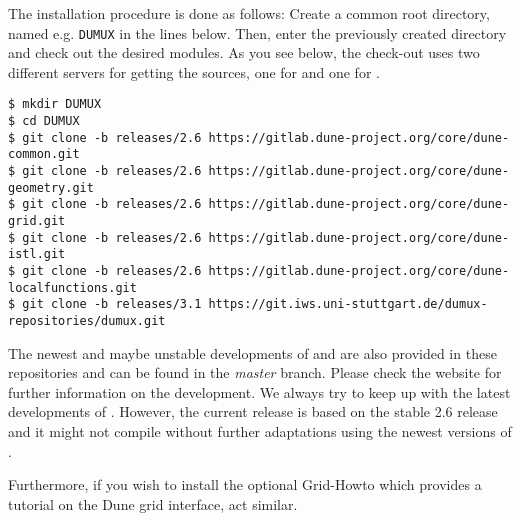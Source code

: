 The installation procedure is done as follows:
Create a common root directory, named e.g. \texttt{DUMUX} in the lines below.
Then, enter the previously created directory and check out the desired modules.
As you see below, the check-out uses two different servers for getting the sources,
one for \Dune and one for \Dumux.

\begin{lstlisting}[style=Bash]
$ mkdir DUMUX
$ cd DUMUX
$ git clone -b releases/2.6 https://gitlab.dune-project.org/core/dune-common.git
$ git clone -b releases/2.6 https://gitlab.dune-project.org/core/dune-geometry.git
$ git clone -b releases/2.6 https://gitlab.dune-project.org/core/dune-grid.git
$ git clone -b releases/2.6 https://gitlab.dune-project.org/core/dune-istl.git
$ git clone -b releases/2.6 https://gitlab.dune-project.org/core/dune-localfunctions.git
$ git clone -b releases/3.1 https://git.iws.uni-stuttgart.de/dumux-repositories/dumux.git
\end{lstlisting}

The newest and maybe unstable developments of \Dune and \Dumux are also provided in these repositories and can be found in the \emph{master} branch.
Please check the \Dune website \cite{DUNE-HP} for further information on the \Dune development. We always try to keep up with the latest developments of \Dune.
However, the current \Dumux release is based on the stable 2.6 release and it might not compile without further adaptations using the newest versions of \Dune.

Furthermore, if you wish to install the optional \Dune Grid-Howto which provides a tutorial
on the Dune grid interface, act similar.

